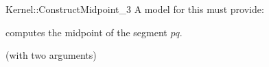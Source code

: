 \begin{ccRefFunctionObjectConcept}{Kernel::ConstructMidpoint_3}
A model for this must provide:


 {computes the midpoint of the segment $pq$.}

\ccRefines
{} (with two arguments)

\ccSeeAlso
{} \\

\end{ccRefFunctionObjectConcept}
